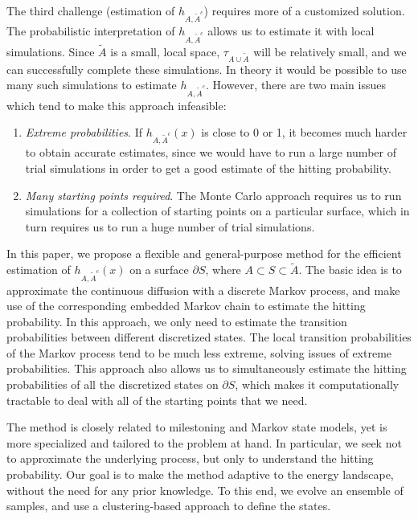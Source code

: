 \documentclass[english, aip, jcp, priprint, graphicx]{revtex4-1}
\theoremstyle{plain}
\theoremstyle{definition}
\theoremstyle{plain}
\begin{document}
The third challenge (estimation of $h_{A,\tilde A^c}$) requires more of a customized solution. The probabilistic interpretation of $h_{A, \tilde{A}^c}$ allows us to estimate it with local simulations. Since $\tilde{A}$ is a small, local space, $\tau_{A \cup \tilde{A}}$ will be relatively small, and we can successfully complete these simulations. In theory it would be possible to use many such simulations to estimate $h_{A,\tilde{A}^c}$. However, there are two main issues which tend to make this approach infeasible:
\begin{enumerate}
\item \emph{Extreme probabilities}.  If $h_{A, \tilde{A}^c} (x)$ is close to 0 or 1, it becomes much harder
to obtain accurate estimates, since we would have to run a large number of
trial simulations in order to get a good estimate of the hitting
probability.

\item \emph{Many starting points required}.  The Monte Carlo approach requires us to run simulations for a collection of starting points on a particular surface, which in turn requires us to run a huge number of trial simulations. 
\end{enumerate}
In this paper, we propose a flexible and general-purpose method for the
efficient estimation of $h_{A, \tilde{A}^c} (x)$ on a surface $\partial S$, where $A \subset S \subset \tilde{A}$. The basic idea is to approximate the continuous diffusion with a discrete Markov process, and make use of the corresponding embedded Markov chain to estimate the hitting probability. In this approach, we only need to estimate the transition probabilities between different discretized states. The local transition probabilities of the Markov process tend to be much less extreme, solving issues of extreme probabilities.  This approach also allows us to simultaneously estimate the hitting probabilities of all the discretized states on $\partial S$, which makes it computationally tractable to deal with all of the starting points that we need.

The method is closely related to milestoning\cite{West2007-cn, Bello-Rivas2015-ld, Aristoff2016-gc} and Markov state models\cite{Pande2010-yi, Chodera2014-bh, Husic2018-xp}, yet is more specialized and tailored to the problem at hand. In particular, we seek not to approximate the underlying process, but only to understand the hitting probability. Our goal is to make the method adaptive to the energy landscape, without the need for any prior knowledge. To this end, we evolve an ensemble of samples, and use a clustering-based approach to define the states.
\end{document}

